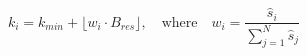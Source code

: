 \begin{equation}
    k_i = k_{min} + \lfloor w_i \cdot B_{res} \rfloor, \quad \text{where} \quad w_i = \frac{\hat{s}_i}{\sum_{j=1}^N \hat{s}_j}
  \label{eq:soft_allocation}
\end{equation}